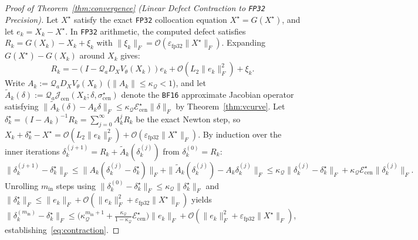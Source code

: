 \documentclass[11pt,a4paper]{article}
\theoremstyle{definition}
\theoremstyle{remark}
\newcommand{\bfsixteen}{\texttt{BF16}}
\newcommand{\fpthirtytwo}{\texttt{FP32}}
\newcommand{\epsfp}{\varepsilon_{\mathrm{fp32}}}
\begin{document}
\begin{proof}[Proof of Theorem~\ref{thm:convergence} (Linear Defect Contraction to \fpthirtytwo{} Precision)]
Let $X^\star$ satisfy the exact \fpthirtytwo{} collocation equation $X^\star = G(X^\star)$, and let $e_k = X_k - X^\star$. In \fpthirtytwo{} arithmetic, the computed defect satisfies $R_k = G(X_k) - X_k + \xi_k$ with $\|\xi_k\|_F = \mathcal{O}(\epsfp \|X^\star\|_F)$. Expanding $G(X^\star) - G(X_k)$ around $X_k$ gives:
\begin{equation*}
    R_k = -(I - \mathcal{Q}_a D_X V_\theta(X_k)) e_k + \mathcal{O}(L_2 \|e_k\|_F^2) + \xi_k.
\end{equation*}
Write $A_k := \mathcal{Q}_a D_X V_\theta(X_k)$ ($\|A_k\| \le \kappa_{\mathcal{Q}} < 1$), and let $\tilde{A}_k(\delta) := \mathcal{Q}_a \mathcal{J}_{\mathrm{cen}}(X_k; \delta, \sigma_{\mathrm{cen}}^\star)$ denote the \bfsixteen{} approximate Jacobian operator satisfying $\|\tilde{A}_k(\delta) - A_k \delta\|_F \le \kappa_{\mathcal{Q}} \mathcal{E}_{\mathrm{cen}}^\star \|\delta\|_F$ by Theorem~\ref{thm:vcurve}. Let $\delta_k^\star = (I - A_k)^{-1} R_k = \sum_{j=0}^\infty A_k^j R_k$ be the exact Newton step, so $X_k + \delta_k^\star - X^\star = \mathcal{O}(L_2 \|e_k\|_F^2) + \mathcal{O}(\epsfp \|X^\star\|_F)$. By induction over the inner iterations $\delta_k^{(j+1)} = R_k + \tilde{A}_k(\delta_k^{(j)})$ from $\delta_k^{(0)} = R_k$:
\begin{equation*}
    \|\delta_k^{(j+1)} - \delta_k^\star\|_F \le \|A_k(\delta_k^{(j)} - \delta_k^\star)\|_F + \|\tilde{A}_k(\delta_k^{(j)}) - A_k \delta_k^{(j)}\|_F
    \le \kappa_{\mathcal{Q}} \|\delta_k^{(j)} - \delta_k^\star\|_F + \kappa_{\mathcal{Q}} \mathcal{E}_{\mathrm{cen}}^\star \|\delta_k^{(j)}\|_F.
\end{equation*}
Unrolling $m_{\mathrm{in}}$ steps using $\|\delta_k^{(0)} - \delta_k^\star\|_F \le \kappa_{\mathcal{Q}} \|\delta_k^\star\|_F$ and $\|\delta_k^\star\|_F \le \|e_k\|_F + \mathcal{O}(\|e_k\|_F^2 + \epsfp\|X^\star\|_F)$ yields $\|\delta_k^{(m_{\mathrm{in}})} - \delta_k^\star\|_F \le \big(\kappa_{\mathcal{Q}}^{m_{\mathrm{in}}+1} + \frac{\kappa_{\mathcal{Q}}}{1 - \kappa_{\mathcal{Q}}}\mathcal{E}_{\mathrm{cen}}^\star\big)\|e_k\|_F + \mathcal{O}(\|e_k\|_F^2 + \epsfp \|X^\star\|_F)$, establishing~\eqref{eq:contraction}.
\end{proof}
\end{document}
